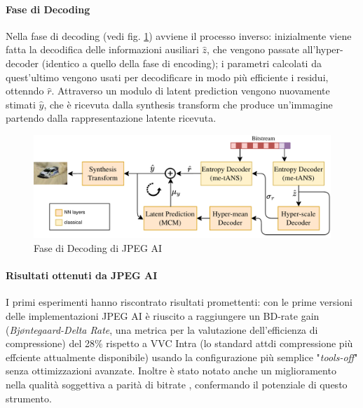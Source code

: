 \paragraph{Fase di Decoding}
Nella fase di decoding (vedi fig. \ref{fig:decodingJPEGAI}) avviene il processo inverso: inizialmente viene fatta la decodifica delle informazioni ausiliari $\hat{z}$, che vengono passate all'hyper-decoder (identico a quello della fase di encoding); i parametri calcolati da quest'ultimo vengono usati per decodificare in modo più efficiente i residui, ottenndo $\hat{r}$. Attraverso un modulo di latent prediction vengono nuovamente stimati $\hat{y}$, che è ricevuta dalla synthesis transform che produce un'immagine partendo dalla rappresentazione latente ricevuta.
\begin{figure}
    \centering
    \includegraphics[width=1\linewidth]{img/decodingJPEGAI.png}
    \caption{Fase di Decoding di JPEG AI}
    \label{fig:decodingJPEGAI}
\end{figure}
\paragraph{Risultati ottenuti da JPEG AI}\label{par:riep}
I primi esperimenti hanno riscontrato risultati promettenti: con le prime versioni delle implementazioni JPEG AI è riuscito a raggiungere un BD-rate gain (\textit{Bjøntegaard-Delta Rate}, una metrica per la valutazione dell'efficienza di compressione) del 28\% \cite{ascenso2023jpegAI}  rispetto a VVC Intra (lo standard attdi compressione più effciente attualmente disponibile) usando la configurazione più semplice "\textit{tools-off}" senza ottimizzazioni avanzate. Inoltre è stato notato anche un miglioramento nella qualità soggettiva a parità di bitrate \cite{ascenso2023jpegAI}, confermando il potenziale di questo strumento.
